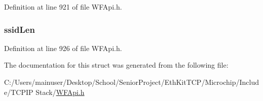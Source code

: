 Definition at line 921 of file W\+F\+Api.\+h.

\hypertarget{structt_w_f_wps_cred_a2172fc4e4cae6a48b945435288912995}{}
\subsubsection[{ssid\+Len}]{ ssid\+Len}\label{structt_w_f_wps_cred_a2172fc4e4cae6a48b945435288912995}


Definition at line 926 of file W\+F\+Api.\+h.



The documentation for this struct was generated from the following file\+:\begin{DoxyCompactItemize}
\item 
C\+:/\+Users/mainuser/\+Desktop/\+School/\+Senior\+Project/\+Eth\+Kit\+T\+C\+P/\+Microchip/\+Include/\+T\+C\+P\+I\+P Stack/\hyperlink{_w_f_api_8h}{W\+F\+Api.\+h}\end{DoxyCompactItemize}
